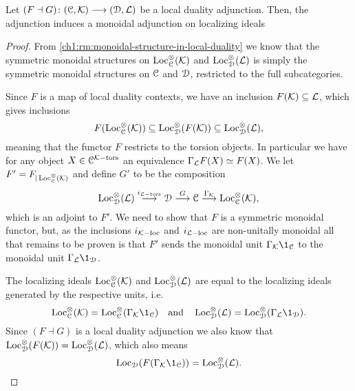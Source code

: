 \begin{lemma}
    \label{ch1:lm:induced-torsion-adjunction}
    Let $(F\dashv G)\colon (\EuScript{C}, \mathcal{K})\longrightarrow (\EuScript{D}, \mathcal{L})$ be a local duality adjunction. Then, the adjunction induces a monoidal adjunction on localizing ideals
    \begin{center}
    \end{center}
\end{lemma}
\begin{proof}
    From \cref{ch1:rm:monoidal-structure-in-local-duality} we know that the symmetric monoidal structures on $\operatorname{Loc}^\otimes_{\EuScript{C}}(\mathcal{K})$ and $\operatorname{Loc}^\otimes_{\EuScript{D}}(\mathcal{L})$ is simply the symmetric monoidal structures on $\EuScript{C}$ and $\EuScript{D}$, restricted to the full subcategories. 
    
    Since $F$ is a map of local duality contexts, we have an inclusion $F(\mathcal{K})\subseteq \mathcal{L}$, which gives inclusions  
    \[F(\operatorname{Loc}^\otimes_{\EuScript{C}}(\mathcal{K}))\subseteq \operatorname{Loc}^\otimes_{\EuScript{D}}(F(\mathcal{K}))\subseteq \operatorname{Loc}^\otimes_{\EuScript{D}}(\mathcal{L}),\]
    meaning that the functor $F$ restricts to the torsion objects. In particular we have for any object $X\in \EuScript{C}^{\mathcal{K}-\mathrm{tors}}$ an equivalence $\Gamma_{\mathcal{L}} F(X) \simeq F(X)$. We let $F'=F_{|\operatorname{Loc}^\otimes_{\EuScript{C}}(\mathcal{K})}$ and define $G'$ to be the composition 
    \[\operatorname{Loc}^{\otimes}_{\EuScript{D}}(\mathcal{L})\overset{i_{\mathcal{L}-\mathrm{tors}}}\longrightarrow \EuScript{D}\overset{G}\longrightarrow \EuScript{C}\overset{\Gamma_{\mathcal{K}}}\longrightarrow \operatorname{Loc}_{\EuScript{C}}^{\otimes}(\mathcal{K}),\]
    which is an adjoint to $F'$. We need to show that $F$ is a symmetric monoidal functor, but, as the inclusions $i_{\mathcal{K}-\mathrm{loc}}$ and $i_{\mathcal{L}-\mathrm{loc}}$ are non-unitally monoidal all that remains to be proven is that $F'$ sends the monoidal unit $\Gamma_\K \1_\C$ to the monoidal unit $\Gamma_\L \1_\D$. 

    The localizing ideals $\operatorname{Loc}_{\EuScript{C}}^\otimes(\mathcal{K})$ and $\operatorname{Loc}_{\EuScript{D}}^\otimes(\mathcal{L})$ are equal to the localizing ideals generated by the respective units, i.e. 
    \[\Loc_\C^\otimes(\K) = \Loc_\C^\otimes(\Gamma_\K\1_\C) \quad \text{and}\quad \Loc_\D^\otimes(\L) = \Loc_\D^\otimes(\Gamma_\L\1_\D).\]
    Since $(F\dashv G)$ is a local duality adjunction we also know that $\operatorname{Loc}^\otimes_{\EuScript{D}}(F(\mathcal{K}))= \operatorname{Loc}_{\EuScript{D}}^\otimes(\mathcal{L})$, which also means 
    \[\Loc_\D(F(\Gamma_\K \1_\C)) = \Loc_\D^\otimes(\L).\]


\end{proof}
